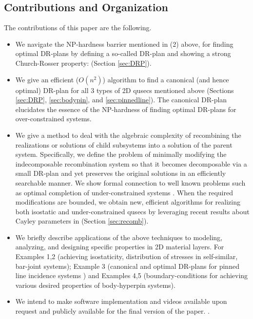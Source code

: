 \subsection{Contributions and Organization}
\label{sec:cont}

The contributions of this paper are the following.
\begin{itemize}
  \item We navigate the NP-hardness barrier mentioned in (2) above,
  for finding optimal DR-plans by defining a so-called 
  DR-plan and showing a strong Church-Rosser property:  (Section \ref{sec:DRP}).

  \item We give an efficient ($O(n^2)$) algorithm to find a canonical
  (and hence optimal) DR-plan for all 3 types of 2D qusecs mentioned
  above (Sections \ref{sec:DRP}, \ref{sec:bodypin}, and
  \ref{sec:pinnedline}). The canonical DR-plan elucidates the essence
  of the NP-hardness of finding optimal DR-plans for over-constrained
  systems.

  \item We give a method to deal with the algebraic complexity of
  recombining the realizations or solutions of child subsystems into a
  solution of the parent system. Specifically, we define the problem
  of minimally modifying the indecomposable recombination system so
  that it becomes decomposable via a small DR-plan and yet preserves
  the original solutions in an efficiently searchable manner. We show
  formal connection to well known problems such as optimal completion
  of under-constrained systems \uncited. When the required
  modifications are bounded, we obtain new, efficient algorithms for
  realizing both isostatic and under-constrained qusecs by leveraging
  recent results about Cayley parameters in \uncited\uncited (Section
  \ref{sec:recomb}).

  \item We briefly describe applications of the above techniques to
  modeling, analyzing, and designing specific properties in 2D material
  layers. For Examples 1,2 (achieving isostaticity, distribution of
  stresses in self-similar, bar-joint systems); Example 3 (canonical
  and optimal DR-plans for pinned line incidence systems \uncited)
  and Examples 4,5 (boundary-conditions for achieving various desired
  properties of body-hyperpin systems).

  \item We intend to make software implementation and videos available
  upon request and publicly available for the final version of the
  paper.
  .
\end{itemize}
